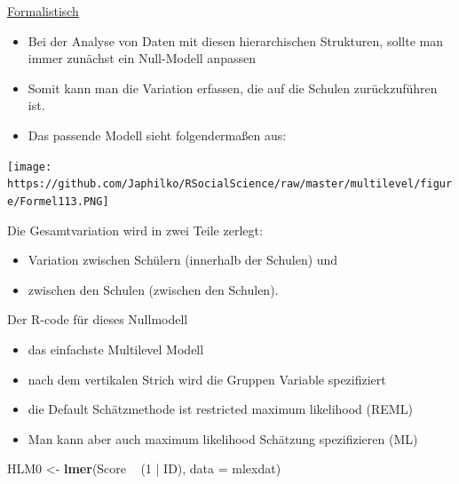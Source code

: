 \documentclass[ignorenonframetext,]{beamer}
\newenvironment{Shaded}{}{}
\newcommand{\KeywordTok}[1]{\textcolor[rgb]{0.00,0.44,0.13}{\textbf{{#1}}}}
\newcommand{\DataTypeTok}[1]{\textcolor[rgb]{0.56,0.13,0.00}{{#1}}}
\newcommand{\DecValTok}[1]{\textcolor[rgb]{0.25,0.63,0.44}{{#1}}}
\newcommand{\StringTok}[1]{\textcolor[rgb]{0.25,0.44,0.63}{{#1}}}
\newcommand{\NormalTok}[1]{{#1}}
\providecommand{\tightlist}{%
\setlength{\itemsep}{0pt}\setlength{\parskip}{0pt}}
\begin{document}
\begin{frame}{\href{http://kesdev.com/you-got-latex-in-my-markdown/}{Formalistisch}}

\begin{itemize}
\item
  Bei der Analyse von Daten mit diesen hierarchischen Strukturen, sollte
  man immer zunächst ein Null-Modell anpassen
\item
  Somit kann man die Variation erfassen, die auf die Schulen
  zurückzuführen ist.
\item
  Das passende Modell sieht folgendermaßen aus:
\end{itemize}

\texttt{[image: https://github.com/Japhilko/RSocialScience/raw/master/multilevel/figure/Formel113.PNG]}

Die Gesamtvariation wird in zwei Teile zerlegt:

\begin{itemize}
\tightlist
\item
  Variation zwischen Schülern (innerhalb der Schulen) und
\item
  zwischen den Schulen (zwischen den Schulen).
\end{itemize}

\end{frame}

\begin{frame}[fragile]{Der R-code für dieses Nullmodell}

\begin{itemize}
\tightlist
\item
  das einfachste Multilevel Modell
\item
  nach dem vertikalen Strich wird die Gruppen Variable spezifiziert
\item
  die Default Schätzmethode ist restricted maximum likelihood (REML)
\item
  Man kann aber auch maximum likelihood Schätzung spezifizieren (ML)
\end{itemize}

\begin{Shaded}
\begin{Highlighting}[]
\NormalTok{HLM0 <-}\StringTok{ }\KeywordTok{lmer}\NormalTok{(Score ~}\StringTok{ }\NormalTok{(}\DecValTok{1} \NormalTok{|}\StringTok{ }\NormalTok{ID), }\DataTypeTok{data =} \NormalTok{mlexdat)}
\end{Highlighting}
\end{Shaded}

\end{frame}
\end{document}
